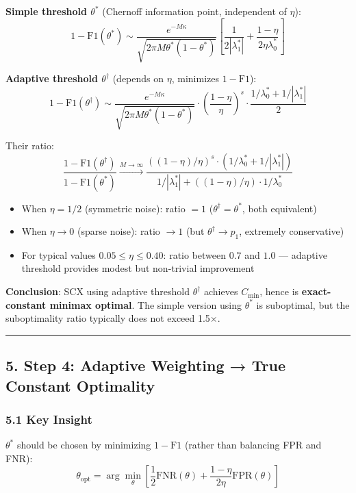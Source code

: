 \documentclass[
  12pt,
]{article}
\providecommand{\tightlist}{%
  \setlength{\itemsep}{0pt}\setlength{\parskip}{0pt}}
\begin{document}
\textbf{Simple threshold \(\theta^*\)} (Chernoff information point, independent of \(\eta\)):
\[1 - \text{F1}(\theta^*) \sim \frac{e^{-M\kappa}}{\sqrt{2\pi M\theta^*(1-\theta^*)}} \left[\frac{1}{2|\lambda_1^*|} + \frac{1-\eta}{2\eta\lambda_0^*}\right]\]

\textbf{Adaptive threshold \(\theta^\dagger\)} (depends on \(\eta\), minimizes \(1-\text{F1}\)):
\[1 - \text{F1}(\theta^\dagger) \sim \frac{e^{-M\kappa}}{\sqrt{2\pi M\theta^*(1-\theta^*)}} \cdot \left(\frac{1-\eta}{\eta}\right)^s \cdot \frac{1/\lambda_0^* + 1/|\lambda_1^*|}{2}\]

Their ratio:
\[\frac{1 - \text{F1}(\theta^\dagger)}{1 - \text{F1}(\theta^*)} \xrightarrow{M\to\infty} \frac{((1-\eta)/\eta)^s \cdot (1/\lambda_0^* + 1/|\lambda_1^*|)}{1/|\lambda_1^*| + ((1-\eta)/\eta) \cdot 1/\lambda_0^*}\]

\begin{itemize}
\tightlist
\item
  When \(\eta = 1/2\) (symmetric noise): ratio \(= 1\) (\(\theta^\dagger = \theta^*\), both equivalent)
\item
  When \(\eta \to 0\) (sparse noise): ratio \(\to 1\) (but \(\theta^\dagger \to p_1\), extremely conservative)
\item
  For typical values \(0.05 \leq \eta \leq 0.40\): ratio between \(0.7\) and \(1.0\) — adaptive threshold provides modest but non-trivial improvement
\end{itemize}

\textbf{Conclusion}: SCX using adaptive threshold \(\theta^\dagger\) achieves \(C_{\min}\), hence is \textbf{exact-constant minimax optimal}. The simple version using \(\theta^*\) is suboptimal, but the suboptimality ratio typically does not exceed 1.5×.

\begin{center}\rule{0.5\linewidth}{0.5pt}\end{center}

\subsection{5. Step 4: Adaptive Weighting → True Constant Optimality}\label{step-4-adaptive-weighting-true-constant-optimality}

\subsubsection{5.1 Key Insight}\label{key-insight}

\(\theta^*\) should be chosen by minimizing \(1 - \text{F1}\) (rather than balancing FPR and FNR):
\[\theta_{\text{opt}} = \arg\min_{\theta} \left[\frac{1}{2}\text{FNR}(\theta) + \frac{1-\eta}{2\eta}\text{FPR}(\theta)\right]\]
\end{document}
